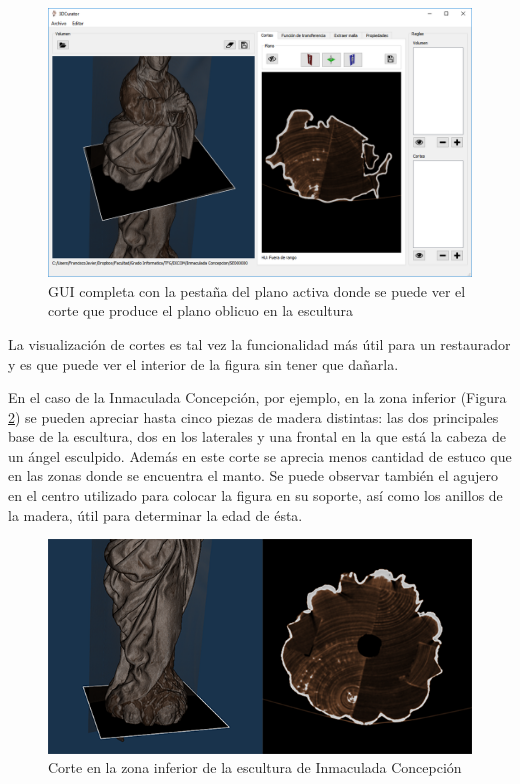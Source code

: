 \begin{figure}[H]
	\centering
	\includegraphics[width=12.5cm]{imagenes/gui_plano}
	\caption{GUI completa con la pestaña del plano activa donde se puede ver el corte que produce el plano oblicuo en la escultura}
	\label{fig:gui_plano}
\end{figure}

La visualización de cortes es tal vez la funcionalidad más útil para un restaurador y es que puede ver el interior de la figura sin tener que dañarla.

En el caso de la Inmaculada Concepción, por ejemplo, en la zona inferior (Figura \ref{fig:corte_inmaculada_concepcion_agujero}) se pueden apreciar hasta cinco piezas de madera distintas: las dos principales base de la escultura,  dos en los laterales y una frontal en la que está la cabeza de un ángel esculpido. Además en este corte se aprecia menos cantidad de estuco que en las zonas donde se encuentra el manto. Se puede observar también el agujero en el centro utilizado para colocar la figura en su soporte, así como los anillos de la madera, útil para determinar la edad de ésta.

\begin{figure}[H]
	\centering
	\includegraphics[width=12.5cm]{imagenes/corte_inmaculada_concepcion_agujero}
	\caption{Corte en la zona inferior de la escultura de Inmaculada Concepción}
	\label{fig:corte_inmaculada_concepcion_agujero}
\end{figure}

